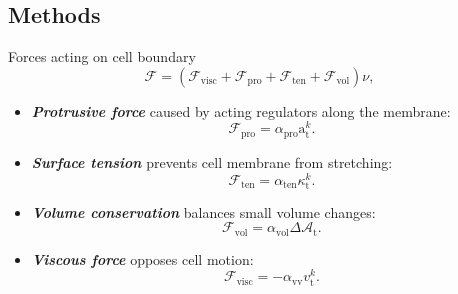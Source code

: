 \documentclass[mathserif,11pt]{beamer}
\DeclareMathOperator{\td}{\mathrm{t}}
\begin{document}
\subsection{Methods}
\begin{frame}{Forces acting on cell boundary}
\begin{equation*}
\mathcal{F} = (\mathcal{F}_{\textrm{visc}} + \mathcal{F}_{\textrm{pro}} + \mathcal{F}_{\textrm{ten}} + \mathcal{F}_{\textrm{vol}})\nu,
\end{equation*}
\begin{itemize}
	\item \textbf{\textit{Protrusive force}} caused by acting regulators along the membrane: \begin{equation*}
	\mathcal{F}_{\textrm{pro}} = \alpha_{\textrm{pro}}\textrm{a}_{\td}^{k}.
	\end{equation*}
	\item \textbf{\textit{Surface tension}} prevents cell membrane from stretching:
	\begin{equation*}
	\mathcal{F}_{\textrm{ten}} = \alpha_{\textrm{ten}} \kappa_{\td}^{k}.
	\end{equation*} 
	\item \textbf{\textit{Volume conservation}} balances small volume changes:
	\begin{equation*}
	\mathcal{F}_{\textrm{vol}} = \alpha_{\textrm{vol}}\Delta\mathcal{A}_{\td}.
	\end{equation*} 
	\item \textbf{\textit{Viscous force}} opposes cell motion:
	\begin{equation*}
	\mathcal{F}_{\textrm{visc}} = -\alpha_{\textrm{vv}}v_{\td}^{k}.
	\end{equation*}
\end{itemize}
$\quad$\\
$\quad$
\end{frame}
\end{document}
